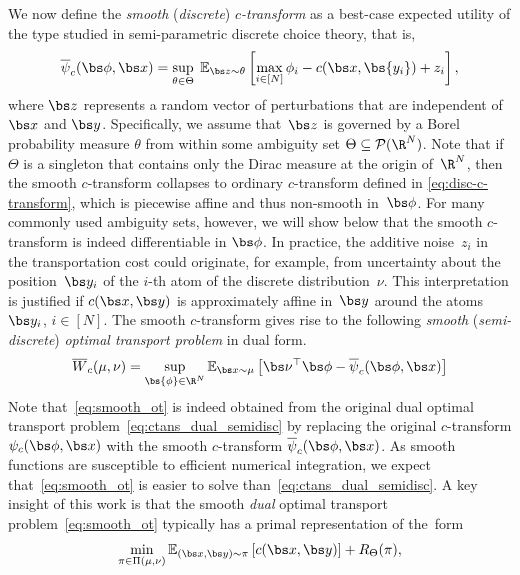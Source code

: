 \documentclass[11pt, a4paper, oneside, reqno]{article}
\begin{document}
	
	We now define the {\em smooth} ({\em discrete}) {\em $c$-transform} as a best-case expected utility of the type studied in semi-parametric discrete choice theory, that is,
	\begin{equation}
	\label{eq:smooth_c_transform}
	\overline{\psi}_c(\bs \phi, \bs x) = \sup_{\theta \in \Theta}\;\mathbb{E}_{\bs z 
		\sim\theta}\left[\max_{i \in [N]} \phi_i -c(\bs x, \bs {y_i}) +z_i \right],
	\end{equation}
	where $\bs z$ represents a random vector of perturbations that are independent of $\bs x$ and $\bs y$. Specifically, we assume  that~$\bs z$ is governed by a Borel probability measure $\theta$ from within some ambiguity set $\Theta\subseteq\mathcal{P}(\R^N)$. Note that if~$\Theta$ is a singleton that contains only the Dirac measure at the origin of~$\R^N$, then the smooth $c$-transform collapses to ordinary $c$-transform defined in \eqref{eq:disc-c-transform}, which is piecewise affine and thus non-smooth in~$\bs \phi$. For many commonly used ambiguity sets, however, we will show below that the smooth $c$-transform is indeed differentiable in $\bs \phi$. In practice, the additive noise~$z_i$ in the transportation cost could originate, for example, from uncertainty about the position~$\bs y_i$ of the $i$-th atom of the discrete distribution~$\nu$. This interpretation is justified if $c(\bs x,\bs y)$ is approximately affine in~$\bs y$ around the atoms~$\bs y_i$, $i\in[N]$. The  smooth $c$-transform gives rise to the following {\em smooth} ({\em semi-discrete}) {\em optimal transport problem} in dual form.
	\begin{equation}
	\label{eq:smooth_ot}
	\overline W_c (\mu, \nu) 
	= \sup\limits_{\bs {\phi} \in \R^N} \mathbb{E}_{\bs x \sim \mu} \left[ \bs \nu^\top \bs \phi - \overline\psi_c(\bs \phi, \bs x)\right]
	\end{equation}
	Note that~\eqref{eq:smooth_ot} is indeed obtained from the original dual optimal transport problem~\eqref{eq:ctans_dual_semidisc} by replacing the original $c$-transform $\psi_c(\bs \phi, \bs x)$ with the smooth $c$-transform $\overline\psi_c(\bs \phi, \bs x)$. As smooth functions are susceptible to efficient numerical integration, we expect that~\eqref{eq:smooth_ot} is easier to solve than~\eqref{eq:ctans_dual_semidisc}. A key insight of this work is that the smooth {\em dual} optimal transport problem~\eqref{eq:smooth_ot} typically has a primal representation of the~form
	\begin{equation}
	\label{eq:reg_ot_pri_abstract}
	\min\limits_{\pi \in \Pi(\mu,\nu)}\mathbb E_{(\bs x, \bs y) \sim \pi}\left[ c(\bs x, \bs y)\right] + R_\Theta(\pi),
	\end{equation}
\end{document}

